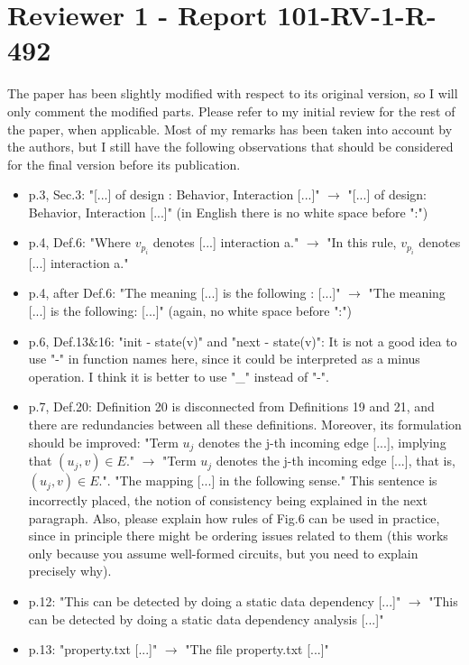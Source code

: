 \section{Reviewer 1 - Report 101-RV-1-R-492}
The paper has been slightly modified with respect to its original version, so I
will only comment the modified parts.
Please refer to my initial review for the rest of the paper, when applicable.
Most of my remarks has been taken into account by the authors, but I still have
the following observations that should be considered for the final version
before its publication.

\begin{itemize}
\item p.3, Sec.3: "[...] of design : Behavior, Interaction [...]" $\rightarrow$ "[...] of
design: Behavior, Interaction [...]" (in English there is no white space before ":")
\item p.4, Def.6: "Where $v_{p_i}$ denotes [...] interaction a." $\rightarrow$ "In this rule,
$v_{p_i}$ denotes [...] interaction a."
\item p.4, after Def.6: "The meaning [...] is the following : [...]" $\rightarrow$ "The meaning
[...] is the following: [...]" (again, no white space before ":")
\item p.6, Def.13\&16: "init - state(v)" and "next - state(v)": It is not a good idea
to use "-" in function names here, since it could be interpreted as a minus
operation. I think it is better to use "\_" instead of "-".
\item p.7, Def.20: Definition 20 is disconnected from Definitions 19 and 21, and
there are redundancies between all these definitions.
Moreover, its formulation should be improved: "Term $u_j$ denotes the j-th
incoming edge [...], implying that $(u_j,v) \in E$." $\rightarrow$ "Term $u_j$ denotes the j-th
incoming edge [...], that is, $(u_j,v) \in E$.".
"The mapping [...] in the following sense." This sentence is incorrectly
placed, the notion of consistency being explained in the next paragraph.
Also, please explain how rules of Fig.6 can be used in practice, since in
principle there might be ordering issues related to them (this works only
because you assume well-formed circuits, but you need to explain precisely why).
\item p.12: "This can be detected by doing a static data dependency [...]" $\rightarrow$ "This
can be detected by doing a static data dependency analysis [...]"
\item p.13: "property.txt [...]" $\rightarrow$ "The file property.txt [...]"
\end{itemize}




